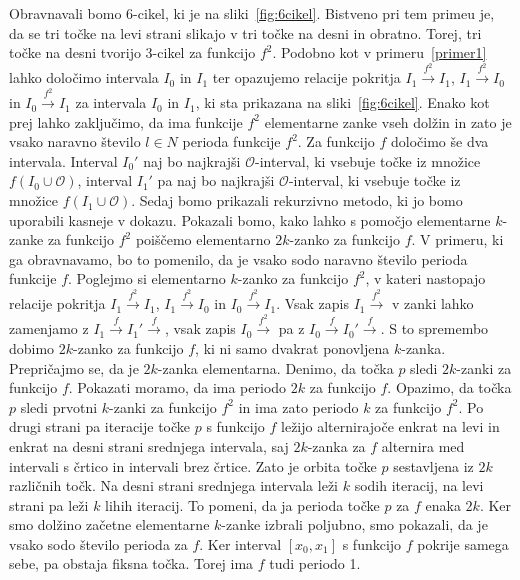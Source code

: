 \documentclass[mat2]{fmfdelo}
\begin{document}
\begin{primer}[6-cikel] \label{primer4}
Obravnavali bomo 6-cikel, ki je na sliki~\ref{fig:6cikel}. Bistveno pri tem primeu je, da se tri točke na levi strani slikajo v tri točke na desni in obratno. Torej, tri točke na desni tvorijo 3-cikel
 za funkcijo $f^2$. Podobno kot v primeru~\ref{primer1} lahko določimo intervala $I_0$ in $I_1$ ter opazujemo relacije pokritja $I_1 \xrightarrow{f^2} I_1$, $I_1 \xrightarrow{f^2} I_0$ in $I_0 \xrightarrow{f^2} I_1$ za intervala $I_0$ in $I_1$, ki sta prikazana na sliki~\ref{fig:6cikel}. Enako kot prej lahko zaključimo, da ima funkcije $f^2$ elementarne zanke vseh dolžin in zato je vsako naravno število $l \in N$ perioda funkcije $f^2$. Za funkcijo $f$ določimo še dva intervala. Interval $I_0'$ naj bo najkrajši $\mathcal{O}$-interval, ki vsebuje točke iz množice $f(I_0 \cup \mathcal{O})$, interval $I_1'$ pa naj bo najkrajši $\mathcal{O}$-interval, ki vsebuje točke iz množice $f(I_1 \cup \mathcal{O})$. Sedaj bomo prikazali rekurzivno metodo, ki jo bomo uporabili kasneje v dokazu. Pokazali bomo, kako lahko s pomočjo elementarne $k$-zanke za funkcijo $f^2$ poiščemo elementarno $2k$-zanko za funkcijo $f$. V primeru, ki ga obravnavamo, bo to pomenilo, da je vsako sodo naravno število perioda funkcije $f$.
Poglejmo si elementarno $k$-zanko za funkcijo $f^2$, v kateri nastopajo relacije pokritja 
$I_1 \xrightarrow{f^2} I_1$, $I_1 \xrightarrow{f^2} I_0$ in $I_0 \xrightarrow{f^2} I_1$. Vsak zapis $I_1 \xrightarrow{f^2}$ v zanki lahko zamenjamo z $I_1 \xrightarrow{f} I_1'  \xrightarrow{f}$, vsak zapis $I_0 \xrightarrow{f^2} $ pa z $I_0 \xrightarrow{f} I_0'  \xrightarrow{f}$. S to spremembo dobimo $2k$-zanko za funkcijo $f$, ki ni samo dvakrat ponovljena $k$-zanka. Prepričajmo se, da je $2k$-zanka elementarna. Denimo, da točka $p$ sledi $2k$-zanki za funkcijo $f$. Pokazati moramo, da ima periodo $2k$ za funkcijo $f$. Opazimo, da točka $p$ sledi prvotni $k$-zanki za funkcijo $f^2$ in ima zato periodo $k$ za funkcijo $f^2$. Po drugi strani pa iteracije točke $p$ s funkcijo $f$ ležijo alternirajoče enkrat na levi in enkrat na desni strani srednjega intervala, saj $2k$-zanka za $f$ alternira med intervali s črtico in intervali brez črtice. Zato je orbita točke $p$ sestavljena iz $2k$ različnih točk. Na desni strani srednjega intervala leži $k$ sodih iteracij, na levi strani pa leži $k$ lihih iteracij. To pomeni, da ja perioda točke $p$ za $f$ enaka $2k$. Ker smo dolžino začetne elementarne $k$-zanke izbrali poljubno, smo pokazali, da je vsako sodo število perioda za $f$. Ker interval $[x_0, x_1]$ s funkcijo $f$ pokrije samega sebe, pa obstaja fiksna točka. Torej ima $f$ tudi periodo 1. 


\end{primer}
\end{document}
